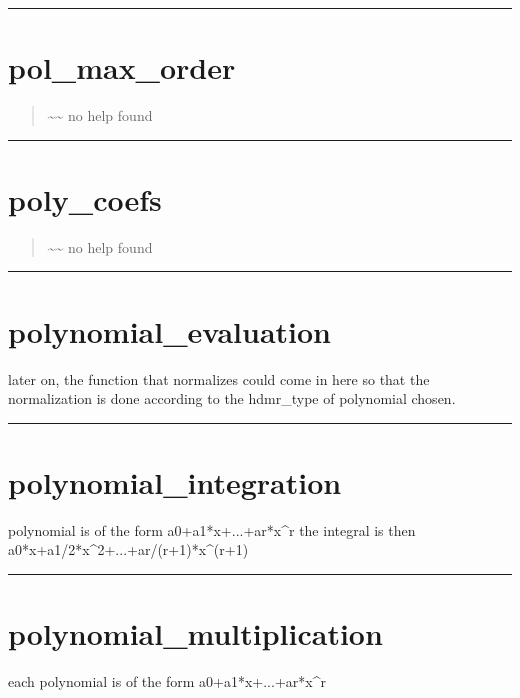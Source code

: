 \documentclass[letterpaper,10pt,english]{sphinxmanual}
\begin{document}
\bigskip\hrule{}\bigskip



\section{pol\_max\_order}
\label{classes/utils/@hdmr/hdmr:id20}\label{classes/utils/@hdmr/hdmr:pol-max-order}\begin{quote}

\textasciitilde{}\textasciitilde{} no help found
\end{quote}


\bigskip\hrule{}\bigskip



\section{poly\_coefs}
\label{classes/utils/@hdmr/hdmr:id21}\label{classes/utils/@hdmr/hdmr:poly-coefs}\begin{quote}

\textasciitilde{}\textasciitilde{} no help found
\end{quote}


\bigskip\hrule{}\bigskip



\section{polynomial\_evaluation}
\label{classes/utils/@hdmr/hdmr:id22}\label{classes/utils/@hdmr/hdmr:polynomial-evaluation}
later on, the function that normalizes could come in here so that the
normalization is done according to the hdmr\_type of polynomial chosen.


\bigskip\hrule{}\bigskip



\section{polynomial\_integration}
\label{classes/utils/@hdmr/hdmr:id23}\label{classes/utils/@hdmr/hdmr:polynomial-integration}
polynomial is of the form a0+a1*x+...+ar*x\textasciicircum{}r
the integral is then a0*x+a1/2*x\textasciicircum{}2+...+ar/(r+1)*x\textasciicircum{}(r+1)


\bigskip\hrule{}\bigskip



\section{polynomial\_multiplication}
\label{classes/utils/@hdmr/hdmr:polynomial-multiplication}\label{classes/utils/@hdmr/hdmr:id24}
each polynomial is of the form a0+a1*x+...+ar*x\textasciicircum{}r
\end{document}
